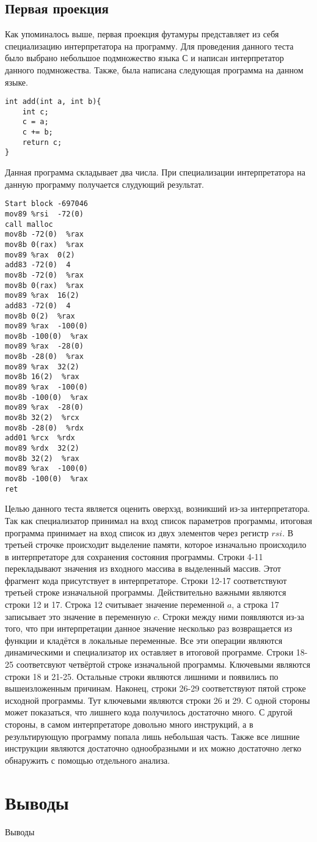 \documentclass{spbau-diploma}
\begin{document}
\subsection{ Первая проекция}
Как упоминалось выше, первая проекция футамуры представляет из себя специализацию интерпретатора на программу. Для проведения данного теста было выбрано небольшое подмножество языка С и написан интерпретатор данного подмножества. Также, была написана следующая программа на данном языке.
\begin{lstlisting}
int add(int a, int b){
    int c;
    c = a;
    c += b;
    return c;
}
\end{lstlisting}
Данная программа складывает два числа. При специализации интерпретатора на данную программу получается слудующий результат.
\begin{lstlisting}
Start block -697046
mov89 %rsi  -72(0) 
call malloc
mov8b -72(0)  %rax
mov8b 0(rax)  %rax
mov89 %rax  0(2)
add83 -72(0)  4
mov8b -72(0)  %rax
mov8b 0(rax)  %rax
mov89 %rax  16(2)
add83 -72(0)  4
mov8b 0(2)  %rax 
mov89 %rax  -100(0) 
mov8b -100(0)  %rax 
mov89 %rax  -28(0) 
mov8b -28(0)  %rax 
mov89 %rax  32(2)
mov8b 16(2)  %rax 
mov89 %rax  -100(0) 
mov8b -100(0)  %rax 
mov89 %rax  -28(0) 
mov8b 32(2)  %rcx 
mov8b -28(0)  %rdx 
add01 %rcx  %rdx 
mov89 %rdx  32(2) 
mov8b 32(2)  %rax 
mov89 %rax  -100(0) 
mov8b -100(0)  %rax 
ret
\end{lstlisting}

Целью данного теста является оценить оверхэд, возникший из-за интерпретатора. Так как специализатор принимал на вход список параметров программы, итоговая программа принимает на вход список из двух элементов через регистр $rsi$. В третьей строчке происходит выделение памяти, которое изначально происходило в интерпретаторе для сохранения состояния программы. Строки 4-11 перекладывают значения из входного массива в выделенный массив. Этот фрагмент кода присутствует в интерпретаторе. Строки 12-17 соответствуют третьей строке изначальной программы. Действительно важными являются строки 12 и 17. Строка 12 считывает значение переменной $a$, а строка 17 записывает это значение в переменную $c$. Строки между ними появляются из-за того, что при интерпретации данное значение несколько раз возвращается из функции и кладётся в локальные переменные. Все эти операции являются динамическими и специализатор их оставляет в итоговой программе. Строки 18-25 соответсвуют четвёртой строке изначальной программы. Ключевыми являются строки 18 и 21-25. Остальные строки являются лишними и появились по вышеизложенным причинам. Наконец, строки 26-29 соответствуют пятой строке исходной программы. Тут ключевыми являются строки 26 и 29. С одной стороны может показаться, что лишнего кода получилось достаточно много. С другой стороны, в самом интерпретаторе довольно много инструкций, а в результирующую программу попала лишь небольшая часть. Также все лишние инструкции являются достаточно однообразными и их можно достаточно легко обнаружить с помощью отдельного анализа.  

\section*{Выводы}

Выводы



\end{document}
